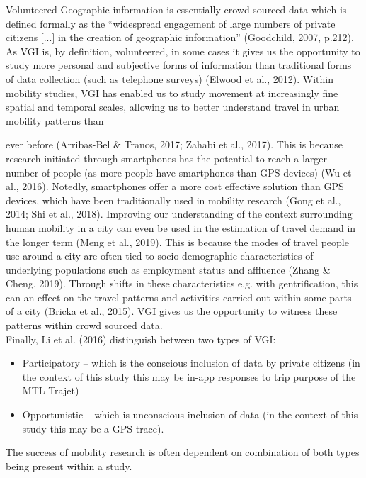 Volunteered Geographic information is essentially crowd sourced data which is defined formally as the “widespread engagement of large numbers of private citizens [...] in the creation of geographic information” (Goodchild, 2007, p.212). As VGI is, by definition, volunteered, in some cases it gives us the opportunity to study more personal and subjective forms of information than traditional forms of data collection (such as telephone surveys) (Elwood et al., 2012).
Within mobility studies, VGI has enabled us to study movement at increasingly fine spatial and temporal scales, allowing us to better understand travel in urban mobility patterns than

ever before (Arribas-Bel \& Tranos, 2017; Zahabi et al., 2017). This is because research initiated through smartphones has the potential to reach a larger number of people (as more people have smartphones than GPS devices) (Wu et al., 2016). Notedly, smartphones offer a more cost effective solution than GPS devices, which have been traditionally used in mobility research (Gong et al., 2014; Shi et al., 2018).
Improving our understanding of the context surrounding human mobility in a city can even be used in the estimation of travel demand in the longer term (Meng et al., 2019). This is because the modes of travel people use around a city are often tied to socio-demographic characteristics of underlying populations such as employment status and affluence (Zhang \& Cheng, 2019). Through shifts in these characteristics e.g. with gentrification, this can an effect on the travel patterns and activities carried out within some parts of a city (Bricka et al., 2015). VGI gives us the opportunity to witness these patterns within crowd sourced data.
\\
Finally, Li et al. (2016) distinguish between two types of VGI:
\begin{itemize}
\item Participatory – which is the conscious inclusion of data by private citizens (in the
context of this study this may be in-app responses to trip purpose of the MTL Trajet)
\item Opportunistic – which is unconscious inclusion of data (in the context of this study
this may be a GPS trace).
\end{itemize}
The success of mobility research is often dependent on combination of both types being present within a study.

